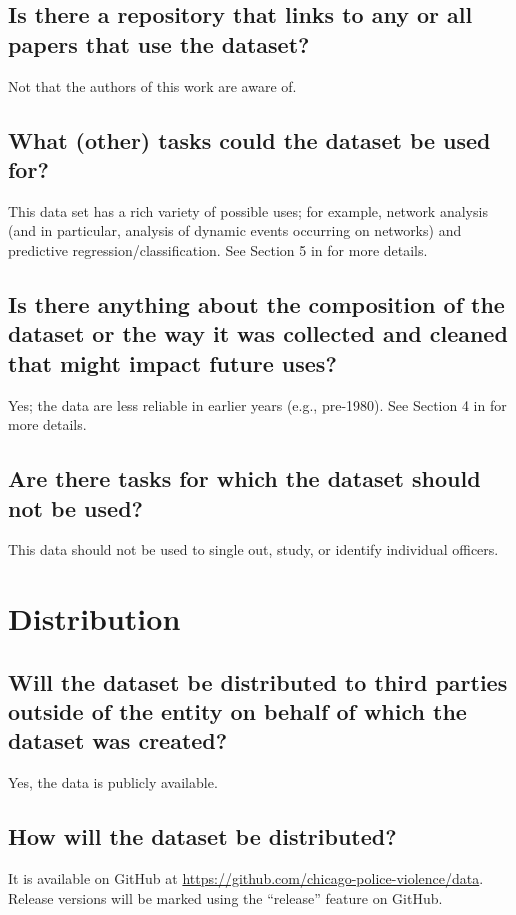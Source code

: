 \documentclass[letterpaper, 10 pt, conference]{ieeeconf}  %
\begin{document}
\subsection{Is there a repository that links to any or all papers that use the dataset?}
Not that the authors of this work are aware of.

\subsection{What (other) tasks could the dataset be used for?}
This data set has a rich variety of possible uses; for example,
network analysis (and in particular, analysis of dynamic events occurring on networks)
and predictive regression/classification. See Section 5 in \cite{horel2021the} for more details.

\subsection{Is there anything about the composition of the dataset or the way it was collected and cleaned that might impact future uses?}
Yes; the data are less reliable in earlier years (e.g., pre-1980). See Section 4 in \cite{horel2021the} for more details.

\subsection{Are there tasks for which the dataset should not be used?}
This data should not be used to single out, study, or identify individual officers.

\section{Distribution}

\subsection{Will the dataset be distributed to third parties outside of the entity on behalf of which the dataset was created?}
Yes, the data is publicly available.

\subsection{How will the dataset be distributed?}
It is available on GitHub at \url{https://github.com/chicago-police-violence/data}.
Release versions will be marked using the ``release'' feature on GitHub.
\end{document}
